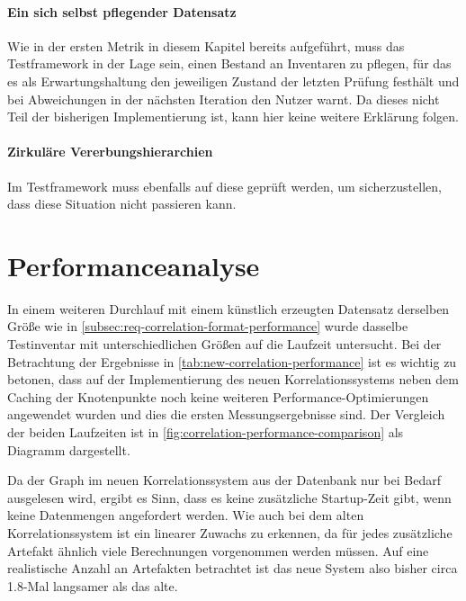 \paragraph{Ein sich selbst pflegender Datensatz}
Wie in der ersten Metrik in diesem Kapitel bereits aufgeführt, muss das Testframework in der Lage sein, einen Bestand an Inventaren zu pflegen, für das es als Erwartungshaltung den jeweiligen Zustand der letzten Prüfung festhält und bei Abweichungen in der nächsten Iteration den Nutzer warnt.
Da dieses nicht Teil der bisherigen Implementierung ist, kann hier keine weitere Erklärung folgen.

\paragraph{Zirkuläre Vererbungshierarchien}
Im Testframework muss ebenfalls auf diese geprüft werden, um sicherzustellen, dass diese Situation nicht passieren kann.


\section{Performanceanalyse}\label{sec:evaluation-performanceanalyse}

In einem weiteren Durchlauf mit einem künstlich erzeugten Datensatz derselben Größe wie in \autoref{subsec:req-correlation-format-performance} wurde dasselbe Testinventar mit unterschiedlichen Größen auf die Laufzeit untersucht.
Bei der Betrachtung der Ergebnisse in \autoref{tab:new-correlation-performance} ist es wichtig zu betonen, dass auf der Implementierung des neuen Korrelationssystems neben dem Caching der Knotenpunkte noch keine weiteren Performance-Optimierungen angewendet wurden und dies die ersten Messungsergebnisse sind.
Der Vergleich der beiden Laufzeiten ist in \autoref{fig:correlation-performance-comparison} als Diagramm dargestellt.

Da der Graph im neuen Korrelationssystem aus der Datenbank nur bei Bedarf ausgelesen wird, ergibt es Sinn, dass es keine zusätzliche Startup-Zeit gibt, wenn keine Datenmengen angefordert werden.
Wie auch bei dem alten Korrelationssystem ist ein linearer Zuwachs zu erkennen, da für jedes zusätzliche Artefakt ähnlich viele Berechnungen vorgenommen werden müssen.
Auf eine realistische Anzahl an Artefakten betrachtet ist das neue System also bisher circa 1.8-Mal langsamer als das alte.

